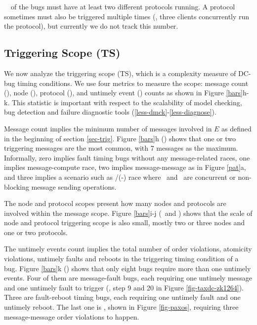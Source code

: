 






\pctProtMany\ \xxx\ of the bugs must
have at least two different protocols running.  A protocol sometimes
must also be triggered multiple times (\eg, three clients concurrently
run the  protocol), but currently we do not track this
number.  
\fi


\vten


\subsection{Triggering Scope (TS)}
\label{trig-scope}


We now analyze the triggering scope (TS), which is a complexity measure of
DC-bug timing conditions.  We use four metrics to measure the scope:
message count (\BTSM), node (\BTSN), protocol (\BTSP), and untimely
event (\BTSU) counts as shown in Figure \ref{bars}h-k.  This statistic
is important with respect to the scalability of model checking, bug
detection and failure diagnostic tools
(\sec\ref{less-dmck}-\ref{less-diagnose}).

Message count implies the minimum
number of messages involved in $E$ as defined in the beginning of
section \ref{sec-trig}.  Figure \ref{bars}h (\BTSM) shows that one or two
triggering messages are the most common, with 7 messages as the
maximum.  Informally, zero implies fault timing bugs without any
message-related races, one implies message-compute race, two implies
message-message as in Figure \ref{pat}a, and three implies a scenario
such as \mac/(\mab-\mbc) race where \mab\ and \mac\ are concurrent or
non-blocking message sending operations.

The node and protocol scopes present how many nodes and protocols are
involved within the message scope.  Figure \ref{bars}i-j (\BTSN\ and
\BTSP) shows that the scale of node and protocol triggering scope is
also small, mostly two or three nodes and one or two protocols.

The untimely events count implies the total number of order
violations, atomicity violations, untimely faults and reboots in the
triggering timing condition of a bug.  Figure \ref{bars}k
(\BTSU) shows that only eight bugs require more than one untimely
events.  Four of them are message-fault bugs, each 
requiring one untimely message and one
untimely fault to trigger (\eg, step 9 and 20 in 
Figure \ref{fig-taxdc-zk1264}).  Three are fault-reboot timing bugs,
each requiring one untimely fault and one untimely reboot.
The last one is , shown in Figure \ref{fig-paxos}, requiring
three message-message order violations to happen.

